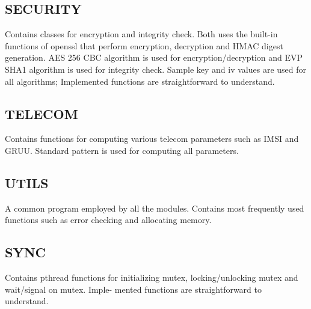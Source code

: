 \documentclass[hidelinks]{report}
\begin{document}
\subsection*{SECURITY}
Contains classes for encryption and integrity check. Both uses the built-in functions of openssl that perform encryption,
decryption and HMAC digest generation. AES 256 CBC algorithm is used for encryption/decryption and EVP SHA1
algorithm is used for integrity check. Sample key and iv values are used for all algorithms; Implemented functions
are straightforward to understand.

\subsection*{TELECOM}
Contains functions for computing various telecom parameters such as IMSI and GRUU. Standard
pattern is used for computing all parameters.

\subsection*{UTILS}
A common program employed by all the modules. Contains most frequently used functions such as error checking
and allocating memory.

\subsection*{SYNC}
Contains pthread functions for initializing mutex, locking/unlocking mutex and wait/signal on mutex. Imple-
mented functions are straightforward to understand.	
\end{document}

